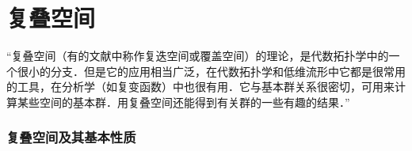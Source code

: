 \chapter{复叠空间}
“复叠空间（有的文献中称作复迭空间或覆盖空间）的理论，是代数拓扑学中的一个很小的分支．但是它的应用相当广泛，在代数拓扑学和低维流形中它都是很常用的工具，在分析学（如复变函数）中也很有用．它与基本群关系很密切，可用来计算某些空间的基本群．用复叠空间还能得到有关群的一些有趣的结果．”
\subsection{复叠空间及其基本性质}
